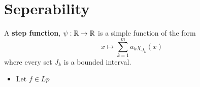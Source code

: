 \section{Seperability}
\begin{definition}
	 A \textbf{step function}, \(\psi: \mathbb{R} \to \mathbb{R}\) 	is a simple function of the form \[
	 x \mapsto \sum_{k=1}^{m} a_{k} \chi_{J_{k}}\left( x \right)
	 \] where every set \(J_{k}\) is a bounded interval.
\end{definition}
\begin{theorem}
\begin{itemize}
	\item Let \(f \in Lp\)
\end{itemize}

\end{theorem}
